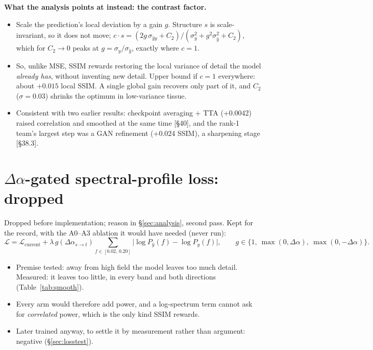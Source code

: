 \documentclass[10pt,a4paper]{article}
\newcommand{\da}{\Delta\alpha}
\begin{document}
\textbf{What the analysis points at instead: the contrast factor.}
\begin{itemize}
  \item Scale the prediction's local deviation by a gain $g$. Structure $s$ is
        scale-invariant, so it does not move; $c\cdot s = (2g\,\sigma_{\hat y y} + C_2)/
        (\sigma_y^2 + g^2\sigma_{\hat y}^2 + C_2)$, which for $C_2 \to 0$ peaks at
        $g = \sigma_y/\sigma_{\hat y}$, exactly where $c = 1$.
  \item So, unlike MSE, SSIM rewards restoring the local variance of detail the model
        \emph{already has}, without inventing new detail. Upper bound if $c = 1$ everywhere:
        about $+0.015$ local SSIM. A single global gain recovers only part of it, and $C_2$
        ($\sigma = 0.03$) shrinks the optimum in low-variance tissue.
  \item Consistent with two earlier results: checkpoint averaging + TTA (+0.0042) raised
        correlation and smoothed at the same time [\S40], and the rank-1 team's largest step
        was a GAN refinement (+0.024 SSIM), a sharpening stage [\S38.3].
\end{itemize}

\section{$\Delta\alpha$-gated spectral-profile loss: dropped}\label{sec:loss}

Dropped before implementation; reason in \S\ref{sec:analysis}, second pass. Kept for the
record, with the A0--A3 ablation it would have needed (never run):
\[
  \mathcal{L} = \mathcal{L}_{\text{current}}
  + \lambda\, g(\da_{s\to t}) \sum_{f \in [0.02,\,0.20]}
    \bigl|\log P_{\hat y}(f) - \log P_{y}(f)\bigr|,
  \qquad g \in \{1,\ \max(0,\da),\ \max(0,-\da)\}.
\]
\begin{itemize}
  \item Premise tested: away from high field the model leaves too much detail. Measured: it
        leaves too little, in every band and both directions (Table~\ref{tab:smooth}).
  \item Every arm would therefore add power, and a log-spectrum term cannot ask for
        \emph{correlated} power, which is the only kind SSIM rewards.
  \item Later trained anyway, to settle it by measurement rather than argument: negative
        (\S\ref{sec:losstest}).
\end{itemize}
\end{document}
